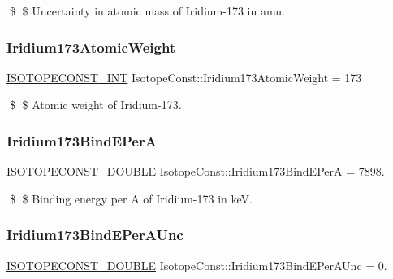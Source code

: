 \$ \$ Uncertainty in atomic mass of Iridium-\/173 in amu. \mbox{\label{group___isotope_const-_iridium-_ir173_ga10b11c1f5ad1e31edaa41f326c863042}} 
\subsubsection{\texorpdfstring{Iridium173\+Atomic\+Weight}{Iridium173AtomicWeight}}
{\footnotesize\ttfamily \mbox{\hyperlink{group___isotope_const-_macros_ga5f18360b3e99483a35c32d789e62621c}{I\+S\+O\+T\+O\+P\+E\+C\+O\+N\+S\+T\+\_\+\+I\+NT}} Isotope\+Const\+::\+Iridium173\+Atomic\+Weight = 173}

\$ \$ Atomic weight of Iridium-\/173. \mbox{\label{group___isotope_const-_iridium-_ir173_ga61d52d6d7807ba8937ded31fbdf045fe}} 
\subsubsection{\texorpdfstring{Iridium173\+Bind\+E\+PerA}{Iridium173BindEPerA}}
{\footnotesize\ttfamily \mbox{\hyperlink{group___isotope_const-_macros_ga8f45a7272ce02c0b4c65c44636ed719a}{I\+S\+O\+T\+O\+P\+E\+C\+O\+N\+S\+T\+\_\+\+D\+O\+U\+B\+LE}} Isotope\+Const\+::\+Iridium173\+Bind\+E\+PerA = 7898.}

\$ \$ Binding energy per A of Iridium-\/173 in keV. \mbox{\label{group___isotope_const-_iridium-_ir173_ga2bfd8b60bb75eabc43f5b194160826e8}} 
\subsubsection{\texorpdfstring{Iridium173\+Bind\+E\+Per\+A\+Unc}{Iridium173BindEPerAUnc}}
{\footnotesize\ttfamily \mbox{\hyperlink{group___isotope_const-_macros_ga8f45a7272ce02c0b4c65c44636ed719a}{I\+S\+O\+T\+O\+P\+E\+C\+O\+N\+S\+T\+\_\+\+D\+O\+U\+B\+LE}} Isotope\+Const\+::\+Iridium173\+Bind\+E\+Per\+A\+Unc = 0.}

